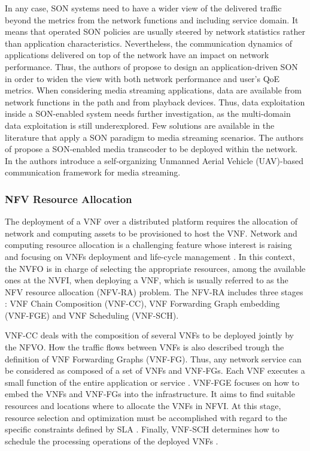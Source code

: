 In any case, SON systems need to have a wider view of the delivered traffic beyond the metrics from the network functions and including service domain. It means that operated SON policies are usually steered by network statistics rather than application characteristics. Nevertheless, the  communication dynamics of applications delivered on top of the network have an impact on network performance. Thus, the authors of \cite{Ouyang2020} propose to design an application-driven SON in order to widen the view with both network performance and user's QoE metrics. When considering media streaming applications, data are available from network functions in the path and from playback devices. Thus, data exploitation inside a SON-enabled system needs further investigation, as the multi-domain data exploitation is still underexplored. Few solutions are available in the literature that apply a SON paradigm to media streaming scenarios. The authors of \cite{Khan2001} propose a SON-enabled media transcoder to be deployed within the network. In \cite{Singhal2021} the authors introduce a self-organizing Unmanned Aerial Vehicle (UAV)-based communication framework for media streaming.


\subsubsection{NFV Resource Allocation}

The deployment of a VNF over a distributed platform requires the allocation of network and computing assets to be provisioned to host the VNF. Network and computing resource allocation is a challenging feature whose interest is raising and focusing on VNFs deployment and life-cycle management \cite{Herrera2016}.
In this context, the NVFO is in charge of selecting the appropriate resources, among the available ones at the NVFI, when deploying a VNF,
which is usually referred to as the NFV resource allocation (NFV-RA) problem. The NFV-RA includes three stages \cite{Herrera2016}: VNF Chain Composition (VNF-CC), VNF Forwarding Graph embedding (VNF-FGE) and VNF Scheduling (VNF-SCH).

VNF-CC deals with the composition of several VNFs to be deployed jointly by the NFVO. How the traffic flows between VNFs is also described trough the definition of VNF Forwarding Graphs (VNF-FG). Thus, any network service %
can be considered as composed of a set of VNFs and VNF-FGs. Each VNF executes a small function of the entire application or service \cite{Xie2016}.
VNF-FGE focuses on how to embed the VNFs and VNF-FGs into the infrastructure. It aims to find suitable resources and locations where to allocate the VNFs in NFVI. At this stage, resource selection and optimization must be accomplished with regard to the specific constraints defined by SLA \cite{Schardong2020}.
Finally, VNF-SCH determines how to schedule the processing operations of the deployed VNFs \cite{Riera2014}.

